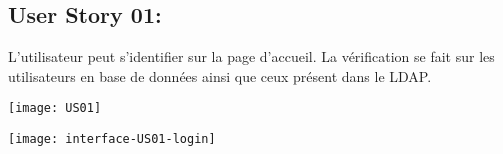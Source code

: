 \newpage{}
\subsection{User Story 01:}
L'utilisateur peut s'identifier sur la page d'accueil. La vérification se fait sur les utilisateurs en base de données
ainsi que ceux présent dans le LDAP.


\begin{center}
      \texttt{[image: US01]}
\end{center}



\begin{center}
      \texttt{[image: interface-US01-login]}
\end{center}

